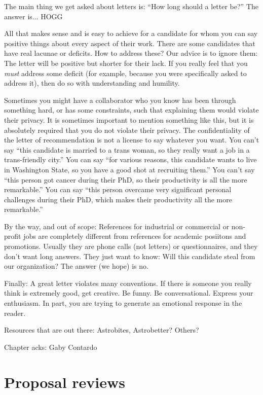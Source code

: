 \documentclass[letterpaper]{book}
\begin{document}
The main thing we get asked about letters is: ``How long should a letter be?''
The answer is... HOGG

All that makes sense and is easy to achieve for a candidate for whom you can say positive things about every aspect of their work.
There are some candidates that have real lacunae or deficits.
How to address these?
Our advice is to ignore them:
The letter will be positive but shorter for their lack.
If you really feel that you \emph{must} address some deficit (for example, because you were specifically asked to address it),
then do so with understanding and humility.

Sometimes you might have a collaborator who you know has been through something hard, or has some constraints, such that explaining them would violate their privacy.
It is sometimes important to mention something like this, but it is absolutely required that you do not violate their privacy.
The confidentiality of the letter of recommendation is not a license to say whatever you want.
You can't say ``this candidate is married to a trans woman, so they really want a job in a trans-friendly city.''
You can say ``for various reasons, this candidate wants to live in Washington State, so you have a good shot at recruiting them.''
You can't say ``this person got cancer during their PhD, so their productivity is all the more remarkable.''
You can say ``this person overcame very significant personal challenges during their PhD, which makes their productivity all the more remarkable.''

By the way, and out of scope: References for industrial or commercial or non-profit jobs are completely different from references for academic posiitons and promotions.
Usually they are phone calls (not letters) or questionnaires, and they don't want long answers.
They just want to know: Will this candidate steal from our organization?
The answer (we hope) is no.

Finally: A great letter violates many conventions.
If there is someone you really think is extremely good, get creative.
Be funny.
Be conversational.
Express your enthusiasm.
In part, you are trying to generate an emotional response in the reader.

Resources that are out there: Astrobites, Astrobetter? Others?

Chapter acks: Gaby Contardo

\chapter{Proposal reviews}
\end{document}

